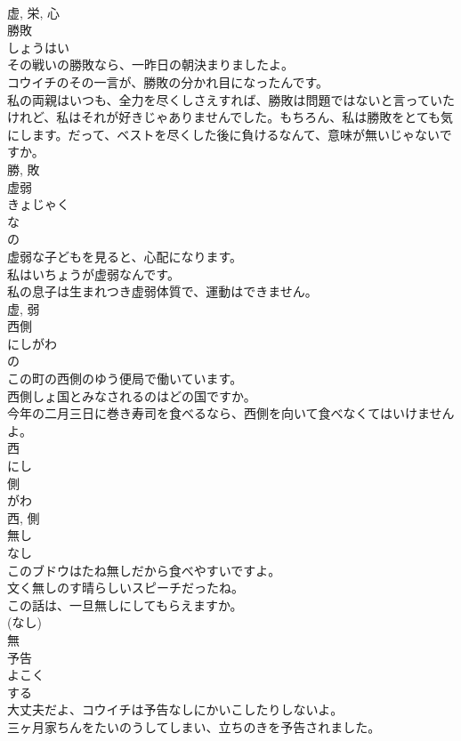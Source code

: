 \documentclass[8pt]{extreport}
\begin{document}
\begin{CJK}{UTF8}{min}
\\	虚, 栄, 心	
\\	勝敗	
\\	しょうはい	
\\	その戦いの勝敗なら、一昨日の朝決まりましたよ。	
\\	コウイチのその一言が、勝敗の分かれ目になったんです。	
\\	私の両親はいつも、全力を尽くしさえすれば、勝敗は問題ではないと言っていたけれど、私はそれが好きじゃありませんでした。もちろん、私は勝敗をとても気にします。だって、ベストを尽くした後に負けるなんて、意味が無いじゃないですか。	
\\	勝, 敗	
\\	虚弱	
\\	きょじゃく	
\\	な 
\\	の 
\\	虚弱な子どもを見ると、心配になります。	
\\	私はいちょうが虚弱なんです。	
\\	私の息子は生まれつき虚弱体質で、運動はできません。	
\\	虚, 弱	
\\	西側	
\\	にしがわ	
\\	の 
\\	この町の西側のゆう便局で働いています。	
\\	西側しょ国とみなされるのはどの国ですか。	
\\	今年の二月三日に巻き寿司を食べるなら、西側を向いて食べなくてはいけませんよ。	
\\	西 
\\	にし 
\\	側 
\\	がわ 
\\	西, 側	
\\	無し	
\\	なし	
\\	このブドウはたね無しだから食べやすいですよ。	
\\	文く無しのす晴らしいスピーチだったね。	
\\	この話は、一旦無しにしてもらえますか。	
\\	(なし) 
\\	無	
\\	予告	
\\	よこく	
\\	する 
\\	大丈夫だよ、コウイチは予告なしにかいこしたりしないよ。	
\\	三ヶ月家ちんをたいのうしてしまい、立ちのきを予告されました。	

\end{CJK}
\end{document}
